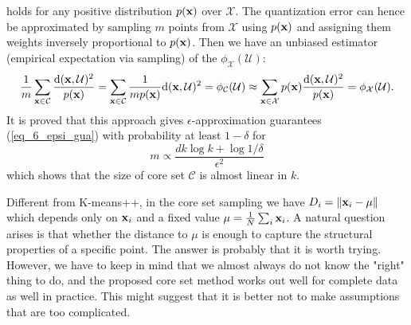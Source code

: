 \documentclass[../main.tex]{subfiles}
\begin{document}
holds for any positive distribution $p({\bf x})$ over $\mathcal{X}$. The quantization error can hence be approximated by sampling $m$ points from $\mathcal{X}$ using $p({\bf x})$ and assigning them weights inversely proportional to $p({\bf x})$. Then we have an unbiased estimator (empirical expectation via sampling) of the $\phi_{\mathcal{X}}(\mathcal{U})$:
\begin{equation*}
\frac{1}{m}\sum_{{\bf x}\in \mathcal{C}}\frac{{\rm d}({\bf x},\mathcal{U})^2}{p({\bf x})} =\sum_{{\bf x}\in \mathcal{C}} \frac{1}{mp({\bf x})}{\rm d}({\bf x},\mathcal{U})^2 = \phi_{\mathcal{C}}(\mathcal{U}) \approx  \sum_{{\bf x}\in \mathcal{X}}p({\bf x})\frac{{\rm d}({\bf x}, \mathcal{U})^2}{p({\bf x})} =\phi_{\mathcal{X}}(\mathcal{U}).
\end{equation*}
It is proved that this approach gives $\epsilon$-approximation guarantees (\ref{eq_6_epsi_gua}) with probability at least $1-\delta$ for
\begin{equation*}
m\propto\frac{dk\log k+\log 1/\delta}{\epsilon^2}
\end{equation*}
which shows that the size of core set $\mathcal{C}$ is almost linear in $k$.
\begin{remark}
	Different from K-means++, in the core set sampling we have $D_i = \|{\bf x}_i-\mu\|$ which depends only on ${\bf x}_i$ and a fixed value $\mu=\frac{1}{N}\sum_i {\bf x}_i$. A natural question arises is that whether the distance to $\mu$ is enough to capture the structural properties of a specific point. The answer is probably that it is worth trying. However, we have to keep in mind that we almost always do not know the "right" thing to do, and the proposed core set method works out well for complete data as well in practice. This might suggest that it is better not to make assumptions that are too complicated.
\end{remark}
\end{document}
